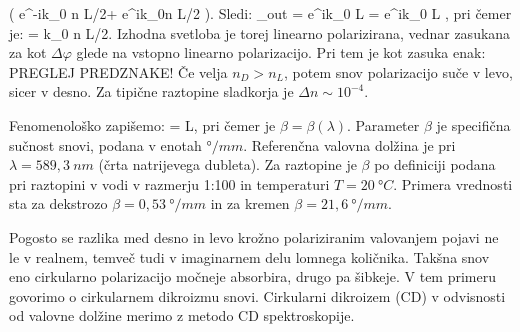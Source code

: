 \left(
\left[\begin{array}{c}
1\\
-i\\
\end{array}\right]e^{-ik_0 \Delta n L/2}+
\left[\begin{array}{c}
1\\
i\\
\end{array}\right]e^{ik_0\Delta n L/2}
\right)\!\!.
\label{eq:09_46}
\eeq
Sledi:
\beq
{}_{out}  =  e^{ik_0 L}
 = 
e^{ik_0 L}
\!\!,
\label{eq:09_47}
\eeq
pri čemer je:
\beq
\Delta \varphi = k_0 \Delta n L/2.
\label{eq:09_48}
\eeq
Izhodna svetloba je torej linearno polarizirana, vednar zasukana za kot 
$\Delta \varphi$ glede na vstopno linearno polarizacijo. Pri tem je kot zasuka enak:
PREGLEJ PREDZNAKE!
Če velja $n_D>n_L$, potem snov polarizacijo suče v levo, sicer v desno. Za tipične
raztopine sladkorja je $\Delta n \sim 10^{-4}$.

Fenomenološko zapišemo:
\beq
\Delta \varphi = \beta L,
\label{eq:09_50}
\eeq
pri čemer je $\beta = \beta (\lambda)$. Parameter $\beta$ je specifična sučnost snovi,
podana v enotah $\si{\degree}/\si{mm}$. Referenčna valovna dolžina je pri $\lambda = 589,3~\si{nm}$
(črta natrijevega dubleta). Za raztopine je $\beta$ po definiciji podana pri raztopini v vodi
v razmerju 1:100 in temperaturi $T = 20~\si{\degree}C$. Primera vrednosti sta za dekstrozo
$\beta = 0,53~\si{\degree}/\si{mm}$ in za kremen $\beta = 21,6~\si{\degree}/\si{mm}$.

Pogosto se razlika med desno in levo krožno polariziranim valovanjem pojavi ne le v realnem, 
temveč tudi v imaginarnem delu lomnega količnika. Takšna snov eno cirkularno polarizacijo močneje
absorbira, drugo pa šibkeje. V tem primeru govorimo o cirkularnem dikroizmu snovi. Cirkularni
dikroizem (CD) v odvisnosti od valovne dolžine merimo z metodo CD spektroskopije.

